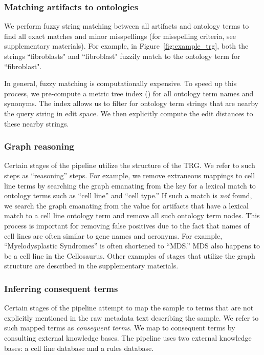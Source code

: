 \subsubsection{Matching artifacts to ontologies}

We perform fuzzy string matching between all artifacts and  ontology terms to find all exact matches and minor misspellings (for misspelling criteria, see supplementary materials). For example, in Figure~\ref{fig:example_trg}, both the strings ``fibroblasts" and ``fibroblast" fuzzily match to the ontology term for ``fibroblast".

In general, fuzzy matching is computationally expensive.  To speed up this process, we pre-compute a  metric tree index (\citealp{Bartolini}) for all ontology term names and synonyms. The index allows us to filter for ontology term strings that are nearby the query string in edit space.  We then explicitly compute the edit distances to these nearby strings. 

\subsubsection{Graph reasoning}

Certain stages of the pipeline utilize the structure of the TRG.  We refer to such steps as ``reasoning'' steps.  For example, we remove extraneous mappings to cell line terms by searching the graph emanating from the key for a lexical match to ontology terms such as ``cell line'' and ``cell type.''  If such a match is \textit{not} found, we search the graph emanating from the value for artifacts that have a lexical match to a cell line ontology term and remove all such ontology term nodes.  This process is important for removing false positives due to the fact that names of cell lines are often similar to gene names and acronyms. For example, ``Myelodysplastic Syndromes'' is often shortened to ``MDS.'' MDS also happens to be a cell line in the Cellosaurus. Other examples of stages that utilize the graph structure are described in the supplementary materials.

\subsubsection{Inferring consequent terms}

Certain stages of the pipeline attempt to map the sample to terms that are not explicitly mentioned in the raw metadata text describing the sample.  We refer to such mapped terms as \textit{consequent terms}.  We map to consequent terms by consulting external knowledge bases.  The pipeline uses two external knowledge bases: a cell line database and a rules database.

